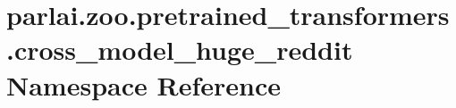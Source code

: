 \hypertarget{namespaceparlai_1_1zoo_1_1pretrained__transformers_1_1cross__model__huge__reddit}{}\section{parlai.\+zoo.\+pretrained\+\_\+transformers.\+cross\+\_\+model\+\_\+huge\+\_\+reddit Namespace Reference}
\label{namespaceparlai_1_1zoo_1_1pretrained__transformers_1_1cross__model__huge__reddit}
